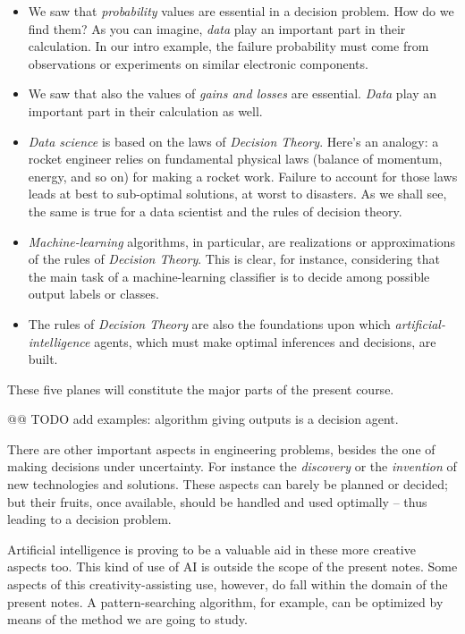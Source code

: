 \documentclass[
  a4paper,
  DIV=11,
  numbers=noendperiod,
  oneside]{scrreprt}
\begin{document}
\begin{itemize}
\item
  We saw that \emph{probability} values are essential in a decision
  problem. How do we find them? As you can imagine, \emph{data} play an
  important part in their calculation. In our intro example, the failure
  probability must come from observations or experiments on similar
  electronic components.
\item
  We saw that also the values of \emph{gains and losses} are essential.
  \emph{Data} play an important part in their calculation as well.
\item
  \emph{Data science} is based on the laws of \emph{Decision Theory}.
  Here's an analogy: a rocket engineer relies on fundamental physical
  laws (balance of momentum, energy, and so on) for making a rocket
  work. Failure to account for those laws leads at best to sub-optimal
  solutions, at worst to disasters. As we shall see, the same is true
  for a data scientist and the rules of decision theory.
\item
  \emph{Machine-learning} algorithms, in particular, are realizations or
  approximations of the rules of \emph{Decision Theory}. This is clear,
  for instance, considering that the main task of a machine-learning
  classifier is to decide among possible output labels or classes.
\item
  The rules of \emph{Decision Theory} are also the foundations upon
  which \emph{artificial-intelligence} agents, which must make optimal
  inferences and decisions, are built.
\end{itemize}

These five planes will constitute the major parts of the present course.

\hfill\break

@@ TODO add examples: algorithm giving outputs is a decision agent.

There are other important aspects in engineering problems, besides the
one of making decisions under uncertainty. For instance the
\emph{discovery} or the \emph{invention} of new technologies and
solutions. These aspects can barely be planned or decided; but their
fruits, once available, should be handled and used optimally -- thus
leading to a decision problem.

Artificial intelligence is proving to be a valuable aid in these more
creative aspects too. This kind of use of AI is outside the scope of the
present notes. Some aspects of this creativity-assisting use, however,
do fall within the domain of the present notes. A pattern-searching
algorithm, for example, can be optimized by means of the method we are
going to study.
\end{document}

